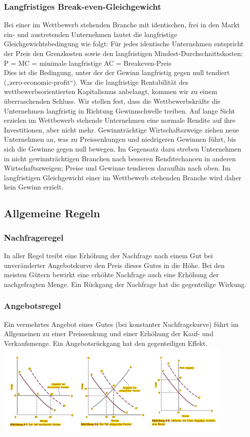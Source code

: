 \documentclass[10pt]{scrartcl}
\begin{document}
\subsubsection{Langfristiges Break-even-Gleichgewicht}
Bei einer im Wettbewerb stehenden Branche mit identischen, frei in den Markt ein- und austretenden Unternehmen lautet die langfristige Gleichgewichtsbedingung wie folgt: Für jedes identische Unternehmen entspricht der Preis den Grenzkosten sowie den langfristigen Mindest-Durchschnittskosten: \\
P = MC = minimale langfristige AC = Breakeven-Preis\\
Dies ist die Bedingung, unter der der Gewinn langfristig gegen null tendiert („zero-economic-profit“).
Was die langfristige Rentabilität des wettbewerbsorientierten Kapitalismus anbelangt,
kommen wir zu einem überraschenden Schluss. Wir stellen fest, dass die Wettbewerbskräfte die Unternehmen langfristig in Richtung Gewinnschwelle treiben. Auf lange Sicht erzielen im Wettbewerb stehende Unternehmen eine normale Rendite auf ihre Investitionen, aber nicht mehr. Gewinnträchtige Wirtschaftszweige ziehen neue Unternehmen an, was zu Preissenkungen und niedrigeren Gewinnen führt, bis sich die Gewinne gegen null bewegen. Im Gegensatz dazu streben Unternehmen in nicht gewinnträchtigen Branchen nach besseren Renditechancen in anderen Wirtschaftszweigen; Preise und Gewinne tendieren daraufhin nach oben. Im langfristigen Gleichgewicht einer im Wettbewerb stehenden Branche wird daher kein Gewinn erzielt.
\subsection{Allgemeine Regeln}
\subsubsection{Nachfrageregel}
In aller Regel treibt eine Erhöhung der Nachfrage nach einem Gut bei unveränderter Angebotskurve den Preis dieses Gutes in die Höhe. Bei den meisten Gütern bewirkt eine erhöhte Nachfrage auch eine Erhöhung der nachgefragten Menge. Ein Rückgang der Nachfrage hat die gegenteilige Wirkung.
\subsubsection{Angebotsregel}
Ein vermehrtes Angebot eines Gutes (bei konstanter Nachfragekurve) führt im Allgemeinen zu einer Preissenkung und einer Erhöhung der Kauf- und Verkaufsmenge. Ein Angebotsrückgang hat den gegenteiligen Effekt.\\
\includegraphics[width=0.88\textwidth]{img/kostenarten.jpg}
\end{document}
